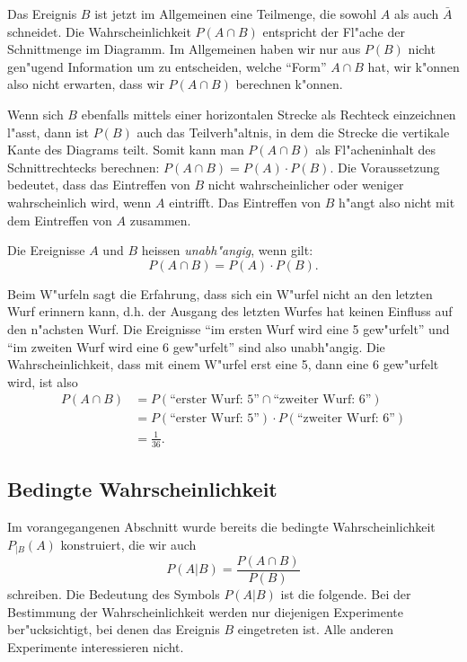 Das Ereignis $B$ ist jetzt im Allgemeinen eine Teilmenge, die sowohl $A$ 
als auch $\bar A$ schneidet. Die Wahrscheinlichkeit $P(A \cap B)$ entspricht
der Fl"ache der Schnittmenge im Diagramm. Im Allgemeinen haben wir
nur aus $P(B)$ nicht gen"ugend Information um zu entscheiden, welche
``Form'' $A\cap B$ hat, wir k"onnen also nicht erwarten, dass wir $P(A\cap B)$
berechnen k"onnen.

Wenn sich $B$ ebenfalls mittels einer horizontalen Strecke als Rechteck
einzeichnen l"asst, dann ist $P(B)$ auch das Teilverh"altnis, in dem
die Strecke die vertikale Kante des Diagrams teilt. Somit kann man $P(A\cap B)$
als Fl"acheninhalt des Schnittrechtecks berechnen: $P(A\cap B)=P(A)\cdot P(B)$.
Die Voraussetzung bedeutet, dass das Eintreffen von $B$ nicht wahrscheinlicher
oder weniger
wahrscheinlich wird, wenn $A$ eintrifft. Das Eintreffen von $B$ h"angt also
nicht mit dem Eintreffen von $A$ zusammen.

\begin{definition}
\label{def-unabhaengige-ereignisse}
Die Ereignisse $A$ und $B$ heissen {\em unabh"angig}, wenn gilt:
\[
P(A\cap B) = P(A)\cdot P(B).
\]
\end{definition}

Beim W"urfeln sagt die Erfahrung, dass sich ein W"urfel nicht an den
letzten Wurf erinnern kann, d.h. der Ausgang des letzten Wurfes hat
keinen Einfluss auf den n"achsten Wurf. Die Ereignisse ``im ersten
Wurf wird eine 5 gew"urfelt'' und ``im zweiten Wurf wird eine 6 gew"urfelt''
sind also unabh"angig. Die Wahrscheinlichkeit, dass mit einem W"urfel
erst eine 5, dann eine 6 gew"urfelt wird, ist also
\begin{align*}
P(A\cap B)&=P(\text{``erster Wurf: 5''}\cap\text{``zweiter Wurf: 6''})\\
&=P(\text{``erster Wurf: 5''})\cdot P(\text{``zweiter Wurf: 6''})\\
&=\frac1{36}.
\end{align*}

\subsection{Bedingte Wahrscheinlichkeit}
Im vorangegangenen Abschnitt wurde bereits die bedingte Wahrscheinlichkeit
$P_{|B}(A)$ konstruiert, die wir auch
\[
P(A|B)=\frac{P(A\cap B)}{P(B)}
\]
schreiben. Die Bedeutung des Symbols $P(A|B)$ ist die folgende. Bei der
Bestimmung der Wahrscheinlichkeit werden nur diejenigen Experimente
ber"ucksichtigt, bei denen das Ereignis $B$ eingetreten ist.
Alle anderen Experimente interessieren nicht.

